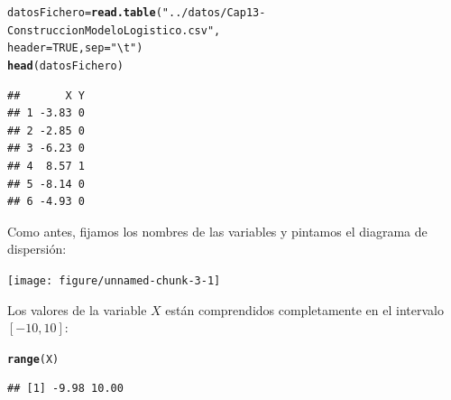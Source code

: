 \documentclass[10pt,a4paper]{article}\usepackage[]{graphicx}\usepackage[]{color}
\makeatletter
\newcommand{\hlnum}[1]{\textcolor[rgb]{0.686,0.059,0.569}{#1}}%
\newcommand{\hlstr}[1]{\textcolor[rgb]{0.192,0.494,0.8}{#1}}%
\newcommand{\hlstd}[1]{\textcolor[rgb]{0.345,0.345,0.345}{#1}}%
\newcommand{\hlkwb}[1]{\textcolor[rgb]{0.69,0.353,0.396}{#1}}%
\newcommand{\hlkwc}[1]{\textcolor[rgb]{0.333,0.667,0.333}{#1}}%
\newcommand{\hlkwd}[1]{\textcolor[rgb]{0.737,0.353,0.396}{\textbf{#1}}}%
\newenvironment{kframe}{%
 \def\at@end@of@kframe{}%
 \ifinner\ifhmode%
  \def\at@end@of@kframe{\end{minipage}}%
  \begin{minipage}{\columnwidth}%
 \fi\fi%
 \def\FrameCommand##1{\hskip\@totalleftmargin \hskip-\fboxsep
 \colorbox{shadecolor}{##1}\hskip-\fboxsep
     \hskip-\linewidth \hskip-\@totalleftmargin \hskip\columnwidth}%
 \MakeFramed {\advance\hsize-\width
   \@totalleftmargin\z@ \linewidth\hsize
   \@setminipage}}%
 {\par\unskip\endMakeFramed%
 \at@end@of@kframe}
\newenvironment{knitrout}{}{} %
\makeatother
\begin{document}
\begin{knitrout}
\color{fgcolor}\begin{kframe}
\begin{alltt}
\hlstd{datosFichero} \hlkwb{=} \hlkwd{read.table}\hlstd{(}\hlstr{"../datos/Cap13-ConstruccionModeloLogistico.csv"}\hlstd{,}
                          \hlkwc{header} \hlstd{=} \hlnum{TRUE}\hlstd{,} \hlkwc{sep}\hlstd{=}\hlstr{"\textbackslash{}t"}\hlstd{)}
\hlkwd{head}\hlstd{(datosFichero)}
\end{alltt}
\begin{verbatim}
##       X Y
## 1 -3.83 0
## 2 -2.85 0
## 3 -6.23 0
## 4  8.57 1
## 5 -8.14 0
## 6 -4.93 0
\end{verbatim}
\end{kframe}
\end{knitrout}
Como antes, fijamos los nombres de las variables y pintamos el diagrama de dispersión:
\begin{knitrout}
\color{fgcolor}

{\centering \texttt{[image: figure/unnamed-chunk-3-1]} 

}



\end{knitrout}

Los valores de la variable $X$ están comprendidos completamente en el intervalo $[-10, 10]$:
\begin{knitrout}
\color{fgcolor}\begin{kframe}
\begin{alltt}
\hlkwd{range}\hlstd{(X)}
\end{alltt}
\begin{verbatim}
## [1] -9.98 10.00
\end{verbatim}
\end{kframe}
\end{knitrout}
\end{document}
